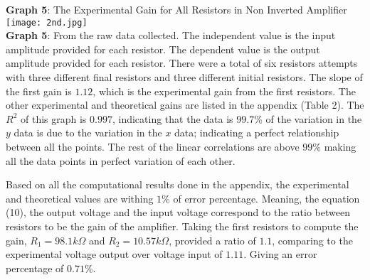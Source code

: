 \documentclass[11pt]{article}
\begin{document}
\begin{center}
    \textbf{Graph 5}: The Experimental Gain for All Resistors in Non Inverted Amplifier\\
    \texttt{[image: 2nd.jpg]}\\\textbf{Graph 5}: From the raw data collected. The independent value is the input amplitude provided for each resistor. The dependent value is the output amplitude provided for each resistor. There were a total of six resistors attempts with three different final resistors and three different initial resistors. The slope of the first gain is $1.12$, which is the experimental gain from the first resistors. The other experimental and theoretical gains are listed in the appendix (Table 2). The $R^2$ of this graph is $0.997$, indicating that the data is $99.7\%$ of the variation in the $y$ data is due to the variation in the $x$ data; indicating a perfect relationship between all the points. The rest of the linear correlations are above $99\%$ making all the data points in perfect variation of each other.
\end{center}
Based on all the computational results done in the appendix, the experimental and theoretical values are withing $1\%$ of error percentage. Meaning, the equation (10), the output voltage and the input voltage correspond to the ratio between resistors to be the gain of the amplifier. Taking the first resistors to compute the gain, $R_1=98.1 k\Omega$ and $R_2=10.57 k\Omega$, provided a ratio of $1.1$, comparing to the experimental voltage output over voltage input of $1.11$. Giving an error percentage of $0.71\%$.\\
\end{document}
